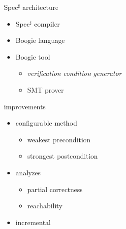 \documentclass{beamer}
\newcommand{\specsharp}{Spec$^\sharp$\xspace}
\begin{document}
\begin{frame}
  \begin{block}{\specsharp architecture}
  \begin{itemize}
  \item \specsharp compiler 
  \item Boogie language
  \item Boogie tool 
    \begin{itemize}
    \item \emph{verification condition generator}
    \item SMT prover
    \end{itemize}
  \end{itemize}
  \end{block}
  \begin{block}{improvements}
  \begin{itemize}
  \item \alert{configurable method}
    \begin{itemize}
    \item weakest precondition
    \item strongest postcondition
    \end{itemize}
  \item analyzes
    \begin{itemize}
    \item partial correctness
    \item \alert{reachability}
    \end{itemize}
  \item \alert{incremental}
  \end{itemize}
  \end{block}
\end{frame}
\begin{frame}
\begin{center}
\end{center}
\end{frame}
\end{document}
